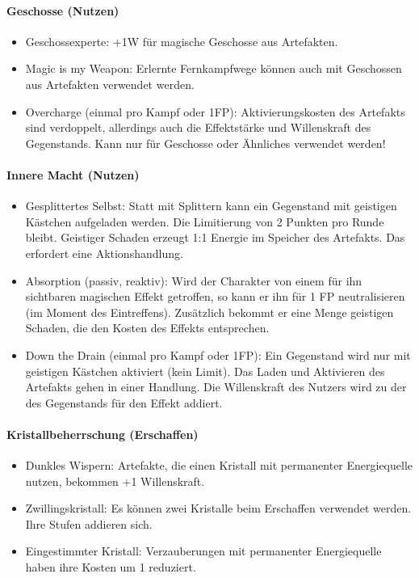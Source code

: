 \documentclass{article}
\begin{document}
\paragraph{Geschosse (Nutzen)}

\begin{itemize}
\item Geschossexperte: +1W für magische Geschosse aus Artefakten.
\item Magic is my Weapon: Erlernte Fernkampfwege können auch mit Geschossen aus Artefakten verwendet werden.
\item Overcharge (einmal pro Kampf oder 1FP): Aktivierungskosten des Artefakts sind verdoppelt, allerdings auch die Effektstärke und Willenskraft des Gegenstands. Kann nur für Geschosse oder Ähnliches verwendet werden!
\end{itemize}

\paragraph{Innere Macht (Nutzen)}

\begin{itemize}
\item Gesplittertes Selbst: Statt mit Splittern kann ein Gegenstand mit geistigen Kästchen aufgeladen werden. Die Limitierung von 2 Punkten pro Runde bleibt. Geistiger Schaden erzeugt 1:1 Energie im Speicher des Artefakts. Das erfordert eine Aktionshandlung.
\item Absorption (passiv, reaktiv): Wird der Charakter von einem für ihn sichtbaren magischen Effekt getroffen, so kann er ihn für 1 FP neutralisieren (im Moment des Eintreffens). Zusätzlich bekommt er eine Menge geistigen Schaden, die den Kosten des Effekts entsprechen.
\item Down the Drain (einmal pro Kampf oder 1FP): Ein Gegenstand wird nur mit geistigen Kästchen aktiviert (kein Limit). Das Laden und Aktivieren des Artefakts gehen in einer Handlung. Die Willenskraft des Nutzers wird zu der des Gegenstands für den Effekt addiert.
\end{itemize}

\paragraph{Kristallbeherrschung (Erschaffen)}

\begin{itemize}
\item Dunkles Wispern: Artefakte, die einen Kristall mit permanenter Energiequelle nutzen, bekommen +1 Willenskraft.
\item Zwillingskristall: Es können zwei Kristalle beim Erschaffen verwendet werden. Ihre Stufen addieren sich.
\item Eingestimmter Kristall: Verzauberungen mit permanenter Energiequelle haben ihre Kosten um 1 reduziert.
\end{itemize}
\end{document}
